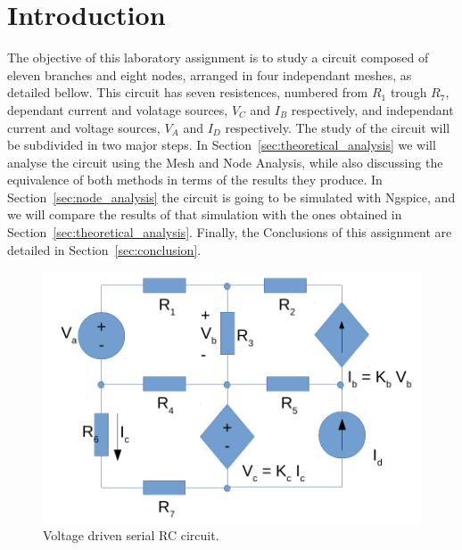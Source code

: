 \section{Introduction}
\label{sec:introduction}

The objective of this laboratory assignment is to study a circuit composed of eleven branches and eight nodes, arranged in four independant meshes,
 as detailed bellow. This circuit has seven resistences, numbered from $R_1$ trough $R_7$, dependant current and volatage sources, $V_C$ and $I_B$ respectively,
 and independant current and voltage sources, $V_A$ and $I_D$ respectively.
The study of the circuit will be subdivided in two major steps. In Section~\ref{sec:theoretical_analysis} we will analyse the circuit using the Mesh and Node Analysis,
while also discussing the equivalence of both methods in terms of the results they produce. In Section~\ref{sec:node_analysis} the circuit is going to be simulated
 with Ngspice, and we will compare the results of that simulation with the ones obtained in Section~\ref{sec:theoretical_analysis}.
Finally, the Conclusions of this assignment are detailed in Section~\ref{sec:conclusion}.

\begin{figure}[h] \centering
\includegraphics[width=0.4\linewidth]{circuit.pdf}
\caption{Voltage driven serial RC circuit.}
\label{fig:rc}
\end{figure}



